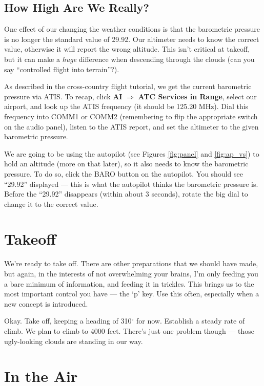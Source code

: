\subsection{How High Are We Really?}

One effect of our changing the weather conditions is that the
barometric pressure is no longer the standard value of 29.92.  Our
altimeter needs to know the correct value, otherwise it will report
the wrong altitude.  This isn't critical at takeoff, but it can make a
\emph{huge} difference when descending through the clouds (can you say
``controlled flight into terrain''?).

As described in the cross-country flight tutorial, we get the current
barometric pressure via ATIS.  To recap, click \textbf{\textsf{AI}}
$\Rightarrow$ \textbf{\textsf{ATC Services in Range}}, select our
airport, and look up the ATIS frequency (it should be 125.20 MHz).
Dial this frequency into COMM1 or COMM2 (remembering to flip the
appropriate switch on the audio panel), listen to the ATIS report, and
set the altimeter to the given barometric pressure.

We are going to be using the autopilot (see Figures \ref{fig:panel}
and \ref{fig:ap_vs}) to hold an altitude (more on that later), so it
also needs to know the barometric pressure.  To do so, click the BARO
button on the autopilot.  You should see ``29.92'' displayed --- this
is what the autopilot thinks the barometric pressure is.  Before the
``29.92'' disappears (within about 3 seconds), rotate the big dial to
change it to the correct value.

\section{Takeoff}

We're ready to take off.  There are other preparations that we should
have made, but again, in the interests of not overwhelming your
brains, I'm only feeding you a bare minimum of information, and
feeding it in trickles.  This brings us to the most important control
you have --- the `p' key.  Use this often, especially when a new
concept is introduced.

Okay.  Take off, keeping a heading of 310$^\circ$ for
now.  Establish
a steady rate of climb.  We plan to climb to 4000 feet.  There's just
one problem though --- those ugly-looking clouds are standing in our
way.

\section{In the Air}

